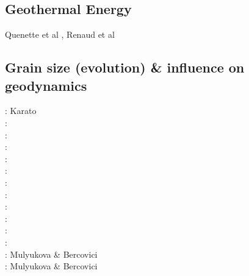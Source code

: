 \subsection{Geothermal Energy} 

\begin{scriptsize}
Quenette et al \cite{quxm15}, Renaud et al \cite{revf19}
\end{scriptsize}

\subsection{Grain size (evolution) \& influence on geodynamics}
\label{sec:topics:gsev}

\begin{scriptsize}
\nineteeneightyfour: Karato \cite{kara84}\\
\nineteeneightynine: \cite{brcp99}\\
\twothousandone: \cite{dets01}\cite{solo01}\\
\twothousandtwo: \cite{soet02}\\
\twothousandthree: \cite{hapa03}\cite{reyu03}\\
\twothousandeight: \cite{sore08}\\
\twothousandeleven: \cite{rorb11}\\
\twothousandthirteen: \cite{beri13}\\
\twothousandfourteen: \cite{besr14}\\
\twothousandfifteen: \cite{thrk15}\cite{tukb15}\cite{pevp15}\cite{glfa15}\\
\twothousandseventeen: \cite{ceww17}\cite{daef17}\cite{mube17}\cite{scdu17}\\
\twothousandeighteen: \cite{bemu18}\cite{bezb18}\cite{mube18}\\
\twothousandnineteen: Mulyukova \& Bercovici \cite{mube19}\\
\twothousandtwenty: Mulyukova \& Bercovici \cite{mube20}
\end{scriptsize}

